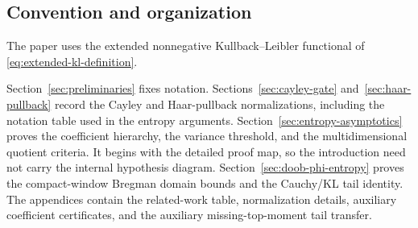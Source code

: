 \subsection*{Convention and organization}

The paper uses the extended nonnegative Kullback--Leibler functional of
\eqref{eq:extended-kl-definition}.

Section~\ref{sec:preliminaries} fixes notation.  Sections~\ref{sec:cayley-gate}
and~\ref{sec:haar-pullback} record the Cayley and Haar-pullback
normalizations, including the notation table used in the entropy arguments.
Section~\ref{sec:entropy-asymptotics} proves the coefficient hierarchy, the
variance threshold, and the multidimensional quotient criteria.  It begins
with the detailed proof map, so the introduction need not carry the internal
hypothesis diagram.  Section~\ref{sec:doob-phi-entropy} proves the
compact-window Bregman domain bounds and the Cauchy/KL tail identity.  The
appendices contain the related-work table, normalization details, auxiliary
coefficient certificates, and the auxiliary missing-top-moment tail transfer.
